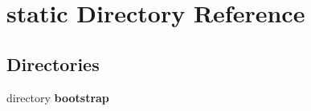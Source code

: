 \section{static Directory Reference}
\label{dir_d8f381a0b77e017d7215fb6cbc9ce255}
\subsection*{Directories}
\begin{DoxyCompactItemize}
\item 
directory {\bf bootstrap}
\end{DoxyCompactItemize}
